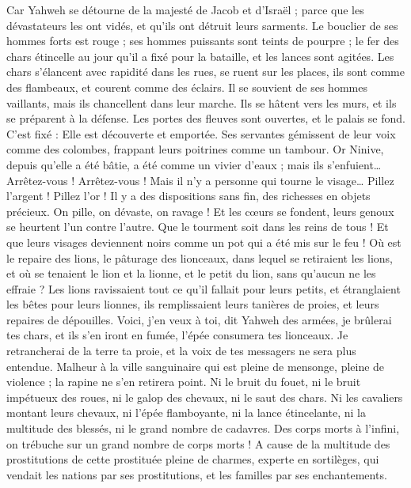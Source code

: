 \begin{multicols}{2}
Car Yahweh se détourne de la majesté de Jacob et d'Israël ; parce que les dévastateurs les ont vidés, et qu'ils ont détruit leurs sarments.
Le bouclier de ses hommes forts est rouge ; ses hommes puissants sont teints de pourpre ; le fer des chars étincelle au jour qu'il a fixé pour la bataille, et les lances sont agitées.
Les chars s’élancent avec rapidité dans les rues, se ruent sur les places, ils sont comme des flambeaux, et courent comme des éclairs.
Il se souvient de ses hommes vaillants, mais ils chancellent dans leur marche. Ils se hâtent vers les murs, et ils se préparent à la défense.
Les portes des fleuves sont ouvertes, et le palais se fond.
C’est fixé : Elle est découverte et emportée. Ses servantes gémissent de leur voix comme des colombes, frappant leurs poitrines comme un tambour.
Or Ninive, depuis qu'elle a été bâtie, a été comme un vivier d'eaux ; mais ils s'enfuient… Arrêtez-vous ! Arrêtez-vous ! Mais il n'y a personne qui tourne le visage…
Pillez l'argent ! Pillez l'or ! Il y a des dispositions sans fin, des richesses en objets précieux.
On pille, on dévaste, on ravage ! Et les cœurs se fondent, leurs genoux se heurtent l'un contre l'autre. Que le tourment soit dans les reins de tous ! Et que leurs visages deviennent noirs comme un pot qui a été mis sur le feu !
Où est le repaire des lions, le pâturage des lionceaux, dans lequel se retiraient les lions, et où se tenaient le lion et la lionne, et le petit du lion, sans qu'aucun ne les effraie ?
Les lions ravissaient tout ce qu'il fallait pour leurs petits, et étranglaient les bêtes pour leurs lionnes, ils remplissaient leurs tanières de proies, et leurs repaires de dépouilles.
Voici, j'en veux à toi, dit Yahweh des armées, je brûlerai tes chars, et ils s'en iront en fumée, l'épée consumera tes lionceaux. Je retrancherai de la terre ta proie, et la voix de tes messagers ne sera plus entendue.
\VerseOne{}Malheur à la ville sanguinaire qui est pleine de mensonge, pleine de violence ; la rapine ne s'en retirera point.
Ni le bruit du fouet, ni le bruit impétueux des roues, ni le galop des chevaux, ni le saut des chars.
Ni les cavaliers montant leurs chevaux, ni l'épée flamboyante, ni la lance étincelante, ni la multitude des blessés, ni le grand nombre de cadavres. Des corps morts à l’infini, on trébuche sur un grand nombre de corps morts !
A cause de la multitude des prostitutions de cette prostituée pleine de charmes, experte en sortilèges, qui vendait les nations par ses prostitutions, et les familles par ses enchantements.

\end{multicols}
